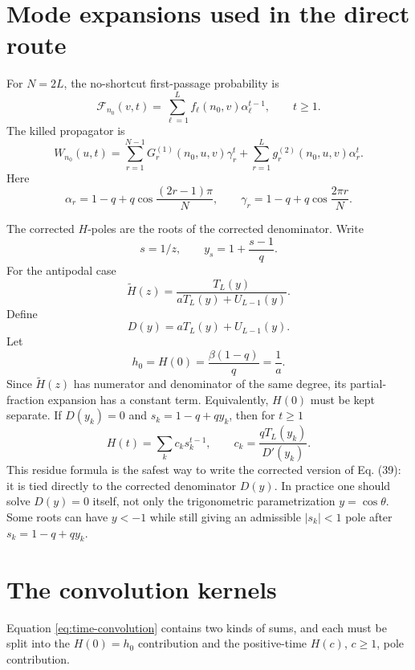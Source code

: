 \documentclass[11pt]{article}
\newcommand{\wt}{\widetilde}
\newcommand{\Fcal}{\mathcal{F}}
\begin{document}
\section{Mode expansions used in the direct route}

For \(N=2L\), the no-shortcut first-passage probability is
\begin{equation}
  \Fcal_{n_0}(v,t)=
  \sum_{\ell=1}^{L}f_\ell(n_0,v)\alpha_\ell^{t-1},
  \qquad t\ge1.
  \label{eq:F0-time}
\end{equation}
The killed propagator is
\begin{equation}
  W_{n_0}(u,t)
  =
  \sum_{r=1}^{N-1}G^{(1)}_r(n_0,u,v)\gamma_r^t
  +
  \sum_{r=1}^{L}g^{(2)}_r(n_0,u,v)\alpha_r^t.
  \label{eq:W-time}
\end{equation}
Here
\[
  \alpha_r=1-q+q\cos\frac{(2r-1)\pi}{N},
  \qquad
  \gamma_r=1-q+q\cos\frac{2\pi r}{N}.
\]

The corrected \(H\)-poles are the roots of the corrected denominator.  Write
\[
  s=1/z,\qquad y_s=1+\frac{s-1}{q}.
\]
For the antipodal case
\begin{equation}
  \wt H(z)=
  \frac{T_L(y)}{aT_L(y)+U_{L-1}(y)}.
  \label{eq:H-T-over-D}
\end{equation}
Define
\[
  D(y)=aT_L(y)+U_{L-1}(y).
\]
Let
\[
  h_0=H(0)=\frac{\beta(1-q)}{q}=\frac1a.
\]
Since \(\wt H(z)\) has numerator and denominator of the same degree, its
partial-fraction expansion has a constant term.  Equivalently, \(H(0)\) must be
kept separate.  If \(D(y_k)=0\) and \(s_k=1-q+qy_k\), then for \(t\ge1\)
\begin{equation}
  H(t)=\sum_k c_k s_k^{t-1},
  \qquad
  \boxed{c_k=\frac{qT_L(y_k)}{D'(y_k)}}.
  \label{eq:H-residue}
\end{equation}
This residue formula is the safest way to write the corrected version of
Eq. (39): it is tied directly to the corrected denominator \(D(y)\).  In
practice one should solve \(D(y)=0\) itself, not only the trigonometric
parametrization \(y=\cos\theta\).  Some roots can have \(y<-1\) while still
giving an admissible \(|s_k|<1\) pole after \(s_k=1-q+qy_k\).

\section{The convolution kernels}

Equation \eqref{eq:time-convolution} contains two kinds of sums, and each must
be split into the \(H(0)=h_0\) contribution and the positive-time \(H(c)\),
\(c\ge1\), pole contribution.
\end{document}
